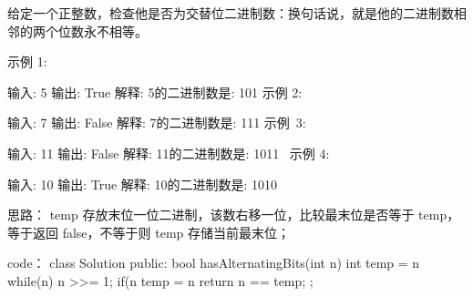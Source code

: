 给定一个正整数，检查他是否为交替位二进制数：换句话说，就是他的二进制数相邻的两个位数永不相等。

示例 1:

输入: 5
输出: True
解释:
5的二进制数是: 101
示例 2:

输入: 7
输出: False
解释:
7的二进制数是: 111
示例 3:

输入: 11
输出: False
解释:
11的二进制数是: 1011
 示例 4:

输入: 10
输出: True
解释:
10的二进制数是: 1010



























思路：
temp 存放末位一位二进制，该数右移一位，比较最末位是否等于 temp，等于返回 false，不等于则 temp 存储当前最末位；



























code：
class Solution {
public:
    bool hasAlternatingBits(int n) {
        int temp = n%
        while(n)
        {
            n >>= 1;
            if(n%
            temp = n%
        }
        return n == temp;
    }
};